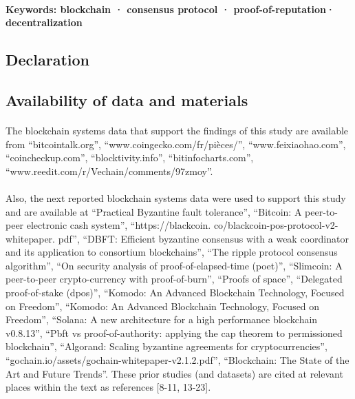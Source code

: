 \documentclass[]{article}
\begin{document}
\begin{CJK*}{UTF8}{gbsn}
\paragraph{Keywords: blockchain · consensus protocol · proof-of-reputation· decentralization}

\renewcommand\thesection{\Roman{section}}
\renewcommand\thesubsection{\Roman{section}.\alph{subsection}}

\begin{center}
	\section*{Declaration}
	\subsection*{Availability of data and materials}
\end{center}
\paragraph{}
	The blockchain systems data that support the findings of this study are available from ``bitcointalk.org'', ``www.coingecko.com/fr/pièces/'', ``www.feixiaohao.com'', ``coincheckup.com'', ``blocktivity.info'', ``bitinfocharts.com'', \\``www.reedit.com/r/Vechain/comments/97zmoy''.
\paragraph{}
	Also, the next reported blockchain systems data were used to support this study and are available at ``Practical Byzantine fault tolerance'', ``Bitcoin: A peer-to-peer electronic cash system'', ``https://blackcoin. co/blackcoin-pos-protocol-v2-whitepaper. pdf'', ``DBFT: Efficient byzantine consensus with a weak coordinator and its application to consortium blockchains'', ``The ripple protocol consensus algorithm'', ``On security analysis of proof-of-elapsed-time (poet)'', ``Slimcoin: A peer-to-peer crypto-currency with proof-of-burn'', ``Proofs of space'', ``Delegated proof-of-stake (dpos)'', ``Komodo: An Advanced Blockchain Technology, Focused on Freedom'', ``Komodo: An Advanced Blockchain Technology, Focused on Freedom'', ``Solana: A new architecture for a high
performance blockchain v0.8.13'', ``Pbft vs proof-of-authority: applying the cap theorem to permissioned blockchain'', ``Algorand: Scaling byzantine agreements for cryptocurrencies'', ``gochain.io/assets/gochain-whitepaper-v2.1.2.pdf'', ``Blockchain: The State of the Art and Future Trends''. These prior studies (and datasets) are cited at relevant places within the text as references [8-11, 13-23].
\begin{center}

\end{center}
\end{CJK*}
\end{document}
